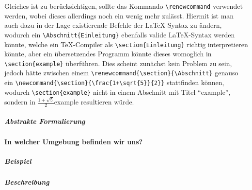 \noindent
Gleiches ist zu berücksichtigen, sollte das Kommando \verb|\renewcommand| verwendet werden, wobei dieses allerdings noch ein wenig mehr zulässt. Hiermit ist man auch dazu in der Lage existierende Befehle der \LaTeX{}-Syntax zu ändern, wodurch ein \verb|\Abschnitt{Einleitung}| ebenfalls valide \LaTeX{}-Syntax werden könnte, welche ein \TeX{}-Compiler als \verb|\section{Einleitung}| richtig interpretieren könnte, aber ein übersetzendes Programm könnte dieses womoglich in \verb|\section{example}| überführen. Dies scheint zunächst kein Problem zu sein, jedoch hätte zwischen einem \verb|\renewcommand{\section}{\Abschnitt}| genauso ein \verb|\newcommand{\section}{\frac{1+\sqrt{5}}{2}}| stattfinden können, wodurch \verb|\section{example}| nicht in einem Abschnitt mit Titel \enquote{example}, sondern in $\frac{1+\sqrt{5}}{2}${example} resultieren würde.

\subparagraph*{Abstrakte Formulierung}





\paragraph*{In welcher Umgebung befinden wir uns?}%
\subparagraph*{Beispiel}
\subparagraph*{Beschreibung}

